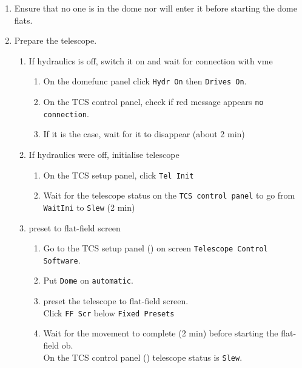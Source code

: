 \documentclass[11pt,fleqn,a4paper]{book}
\begin{document}
   \begin{enumerate}
     \item Ensure that no one is in the \gls{dome} nor will enter it before
     starting the \gls{dome flats}.
     \item Prepare the telescope.
         \begin{enumerate}
            \item If hydraulics is off, switch it on and wait for connection with \gls{vme} 
                \begin{enumerate}
                    \item On the \gls{domefunc} panel click \texttt{Hydr On} then \texttt{Drives On}.
                    \item On the \gls{TCS control panel}, check if red message appears  \texttt{no connection}.
                    \item If it is the case, wait for it to disappear (about 2 min)
                \end{enumerate}
            \item If hydraulics were off, initialise telescope
                \begin{enumerate}
                    \item On the \gls{TCS setup panel}, click \texttt{Tel Init}
                    \item Wait for the telescope status on the \texttt{TCS control panel} to go from \texttt{WaitIni} to \texttt{Slew} (2 min)
                \end{enumerate}
            \item \Gls{preset} to flat-field screen
            \begin{enumerate}
                \item Go to the \gls{TCS setup panel} () on screen \texttt{Telescope Control Software}.
                \item Put \texttt{Dome} on \texttt{automatic}.
                \item \Gls{preset} the telescope to flat-field screen.\\
                  Click \texttt{FF Scr} below \texttt{Fixed Presets}
                \item Wait for the movement to complete (2 min) before starting the flat-field \gls{ob}.\\
                  On the \gls{TCS control panel} () telescope status is \texttt{Slew}.
            \end{enumerate}

\end{enumerate}
\end{enumerate}
\end{document}

